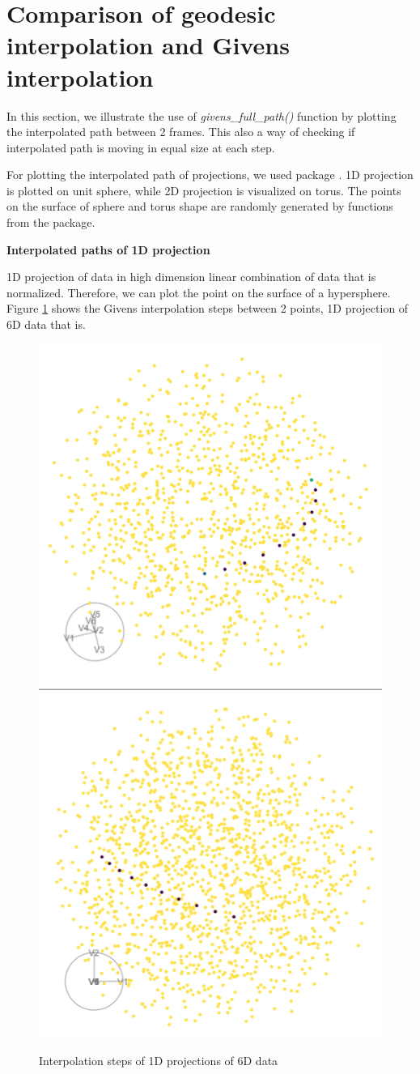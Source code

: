 \hypertarget{comparison-of-geodesic-interpolation-and-givens-interpolation}{%
\section{Comparison of geodesic interpolation and Givens
interpolation}\label{comparison-of-geodesic-interpolation-and-givens-interpolation}}

In this section, we illustrate the use of \emph{givens\_full\_path()}
function by plotting the interpolated path between 2 frames. This also a
way of checking if interpolated path is moving in equal size at each
step.

For plotting the interpolated path of projections, we used
 package \citep{geozoo}. 1D projection is plotted on
unit sphere, while 2D projection is visualized on torus. The points on
the surface of sphere and torus shape are randomly generated by
functions from the  package.

\textbf{Interpolated paths of 1D projection}

1D projection of data in high dimension linear combination of data that
is normalized. Therefore, we can plot the point on the surface of a
hypersphere. Figure \ref{fig:1d-path-static} shows the Givens
interpolation steps between 2 points, 1D projection of 6D data that is.

\begin{Schunk}
\begin{figure}

{\centering \includegraphics[width=0.5\linewidth]{sphere_static} \includegraphics[width=0.5\linewidth]{torus_static} 

}

\caption[Interpolation steps of 1D projections of 6D data]{Interpolation steps of 1D projections of 6D data}\label{fig:1d-path-static}
\end{figure}
\end{Schunk}


